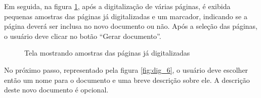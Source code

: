 Em seguida, na figura \ref{fig:dig_5}, após a digitalização de várias páginas, é exibida pequenas amostras das páginas já digitalizadas e um marcador, indicando se a página deverá ser inclusa no novo documento ou não. Após a seleção das páginas, o usuário deve clicar no botão ``Gerar documento''.

\begin{figure}[h]
 \centering
    \setlength\fboxsep{0pt}
    \setlength\fboxrule{0.5pt}
  \caption {Tela mostrando amostras das páginas já digitalizadas}
  \label{fig:dig_5}
\end{figure}

No próximo passo, representado pela figura \ref{fig:dig_6}, o usuário deve escolher então um nome para o documento e uma breve descrição sobre ele. A descrição deste novo documento é opcional.

